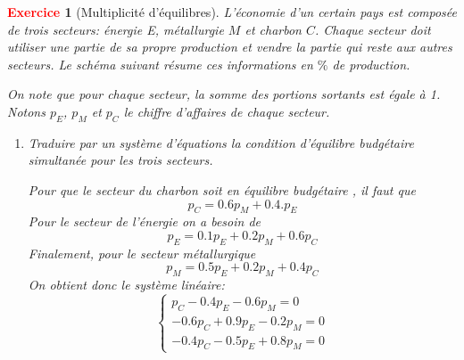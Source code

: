 \documentclass[11pt]{article}
\theoremstyle{mythmstyle}
\newtheorem{exo}{\textcolor{red}{\textbf{Exercice}}}
\begin{document}
\begin{exo}[Multiplicité d'équilibres]
L'économie d'un certain pays est composée de trois secteurs: énergie E, métallurgie $M$ et charbon $C$.  Chaque secteur doit utiliser une partie de sa propre production et vendre la partie qui reste aux autres secteurs.
Le schéma suivant résume ces informations en $\%$ de production.


\begin{figure}[H]
\centering
{}
\end{figure}


On note que pour chaque secteur, la somme des portions sortants est égale à 1. Notons $p_E$, $p_M$ et $p_C$ le chiffre d'affaires de chaque secteur.
 
 
 \begin{enumerate}
 \item Traduire par un système d'équations la condition d'équilibre budgétaire simultanée pour les trois secteurs.
 \begin{solution}
 Pour que le secteur du charbon soit en équilibre budgétaire , il faut que 
 $$p_C= 0.6 p_M+ 0.4.p_E$$
 Pour le secteur de l'énergie on a besoin de 
 $$
 p_E=0.1p_E+ 0.2p_M+ 0.6p_C
 $$
 Finalement, pour le secteur métallurgique
 $$
 p_M=0.5p_E+ 0.2p_M+ 0.4p_C
 $$
 On obtient donc le système linéaire:
 $$
 \begin{cases}
  p_C- 0.4p_E - 0.6p_M=0\\
- 0.6p_C +0.9p_E- 0.2p_M =0\\
-0.4p_C - 0.5p_E+0.8p_M =0
 \end{cases}
 $$


\end{solution}
\end{enumerate}
\end{exo}
\end{document}
